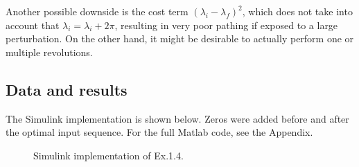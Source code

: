 Another possible downside is the cost term $(\lambda_i - \lambda_f)^2$, which does not take into account that $\lambda_i = \lambda_ i + 2\pi$, resulting in very poor pathing if exposed to a large perturbation. On the other hand, it might be desirable to actually perform one or multiple revolutions.


\clearpage



\subsection{Data and results}

The Simulink implementation is shown below. Zeros were added before and after the optimal input sequence. For the full Matlab code, see the Appendix.

\begin{figure}[H]

    \centering


    \caption{Simulink implementation of Ex.1.4.}

    \label{fig:my_label}

\end{figure}



